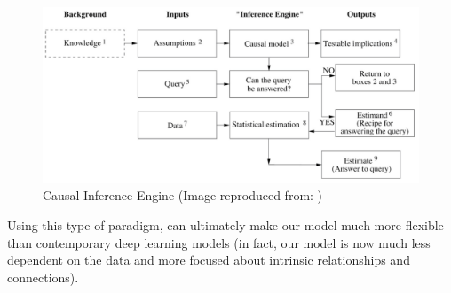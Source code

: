 \begin{figure}[ht!]%
    \centering
    \includegraphics[width=0.8\linewidth]{latex/images/engine.pdf}
    \vspace{-0.2cm}
    \caption{Causal Inference Engine (Image reproduced from: \cite{why})}
    \label{engine}
\end{figure}
\vspace{-0.5cm}

Using this type of paradigm, can ultimately make our model much more flexible than contemporary deep learning models (in fact, our model is now much less dependent on the data and more focused about intrinsic relationships and connections).


